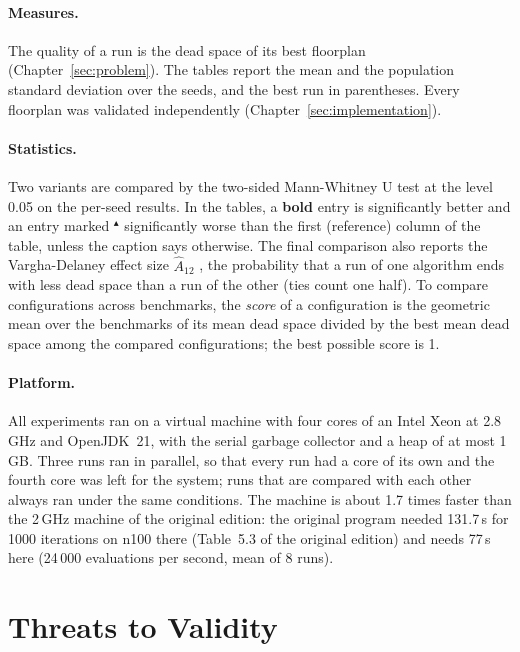 \paragraph{Measures.} The quality of a run is the dead space of its best floorplan (Chapter~\ref{sec:problem}). The tables report the mean and the population standard deviation over the seeds, and the best run in parentheses. Every floorplan was validated independently (Chapter~\ref{sec:implementation}).

\paragraph{Statistics.} Two variants are compared by the two-sided Mann-Whitney U test \cite{mannwhitney} at the level 0.05 on the per-seed results. In the tables, a {\bf bold} entry is significantly better and an entry marked ${}^\blacktriangle$ significantly worse than the first (reference) column of the table, unless the caption says otherwise. The final comparison also reports the Vargha-Delaney effect size $\hat{A}_{12}$ \cite{vargha}, the probability that a run of one algorithm ends with less dead space than a run of the other (ties count one half). To compare configurations across benchmarks, the {\em score} of a configuration is the geometric mean over the benchmarks of its mean dead space divided by the best mean dead space among the compared configurations; the best possible score is 1.

\paragraph{Platform.} All experiments ran on a virtual machine with four cores of an Intel Xeon at 2.8\,GHz and OpenJDK~21, with the serial garbage collector and a heap of at most 1\,GB. Three runs ran in parallel, so that every run had a core of its own and the fourth core was left for the system; runs that are compared with each other always ran under the same conditions. The machine is about 1.7 times faster than the 2\,GHz machine of the original edition: the original program needed 131.7\,s for 1000 iterations on n100 there (Table~5.3 of the original edition) and needs 77\,s here (24\,000 evaluations per second, mean of 8 runs).






\section{Threats to Validity}


